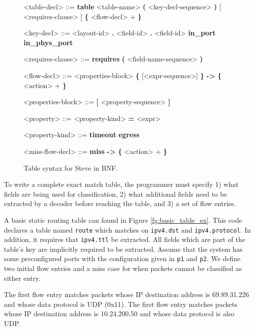 \begin{figure}
\begin{mdframed}
\begin{grammar}
<table-decl> ::=
\textbf{table} <table-name> \textbf{(} <key-decl-sequence> \textbf{)} 
[ <requires-clause> ]
\textbf{\{} 
<flow-decl> + 
\textbf{\}}

<key-decl> ::=
<layout-id> \textbf{.} <field-id>
 \textbf{.} <field-id>
\alt \textbf{in\_port}
\alt \textbf{in\_phys\_port}

<requires-clause> ::=
\textbf{requires} \textbf{(} <field-name-sequence> \textbf{)}

<flow-decl> ::=
<properties-block>
\textbf{\{} [<expr-sequence>] \textbf{\}} \textbf{-\textgreater}
\textbf{\{} 
<action> +
\textbf{\}}

<properties-block> ::=
\textbf{[} <property-sequence> \textbf{]}

<property> ::=
<property-kind> \textbf{=} <expr>

<property-kind> ::=
\textbf{timeout}
\alt \textbf{egress}

<miss-flow-decl> ::=
\textbf{miss} \textbf{-\textgreater}
\textbf{\{} 
<action> +
\textbf{\}}
\end{grammar}
\end{mdframed}
\caption{Table syntax for Steve in BNF.}
\label{fg:table_syntax}
\end{figure}

To write a complete exact match table, the programmer must specify 1) what fields are being used for classification, 2) what additional fields need to be extracted by a decoder before reaching the table, and 3) a set of flow entries. 

A basic static routing table can found in Figure \ref{fg:basic_table_ex}. This code declares a table named \texttt{route} which matches on \texttt{ipv4.dst} and \texttt{ipv4.protocol}. In addition, it requires that \texttt{ipv4.ttl} be extracted. All fields which are part of the table's key are implicitly required to be extracted. Assume that the system has some preconfigured ports with the configuration given in \texttt{p1} and \texttt{p2}. We define two initial flow entries and a miss case for when packets cannot be classified as either entry. 

The first flow entry matches packets whose IP destination address is 69.89.31.226 and whose data protocol is UDP (0x11). The first flow entry matches packets whose IP destination address is 10.24.200.50 and whose data protocol is also UDP.

